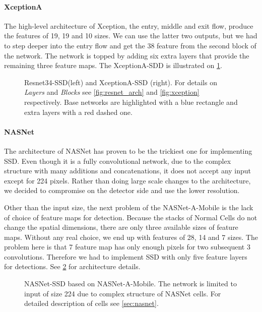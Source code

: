 \paragraph{XceptionA} The high-level architecture of Xception, the entry, middle and exit flow, produce the features of 19, 19 and 10 sizes. We can use the latter two outputs, but we had to step deeper into the entry flow and get the 38 feature from the second block of the network. The network is topped by adding six extra layers that provide the remaining three feature maps. The XceptionA-SDD is illustrated on \cref{fig:resnet_xception_SSD}.


\begin{figure}
    \centering
    \resnetSSD
    \caption[Resnet34-SSD and Xception-SSD]%
    {Resnet34-SSD(left) and XceptionA-SSD (right). For details on \textit{Layers} and \textit{Blocks} see \cref{fig:resnet_arch} and \cref{fig:xception} respectively. Base networks are highlighted with a blue rectangle and extra layers with a red dashed one.}

    \label{fig:resnet_xception_SSD}
\end{figure}



\paragraph{NASNet} The architecture of NASNet has proven to be the trickiest one for implementing SSD. Even though it is a fully convolutional network, due to the complex structure with many additions and concatenations, it does not accept any input except for 224 pixels. Rather than doing large scale changes to the architecture, we decided to compromise on the detector side and use the lower resolution. 

Other than the input size, the next problem of the NASNet-A-Mobile is the lack of choice of feature maps for detection. Because the stacks of Normal Cells do not change the spatial dimensions, there are only three available sizes of feature maps. Without any real choice, we end up with features of 28, 14 and 7 sizes. The problem here is that 7 feature map has only enough pixels for two subsequent 3 convolutions. Therefore we had to implement SSD with only five feature layers for detections. See \cref{fig:nasnetSSD} for architecture details.


\begin{figure}
    \centering
    \nasnetSSD
    \caption[NASNet-SSD]%
    {NASNet-SSD based on NASNet-A-Mobile. The network is limited to input of size 224 due to complex structure of NASNet cells. For detailed description of cells see \cref{sec:nasnet}.}
    \label{fig:nasnetSSD}
\end{figure}


